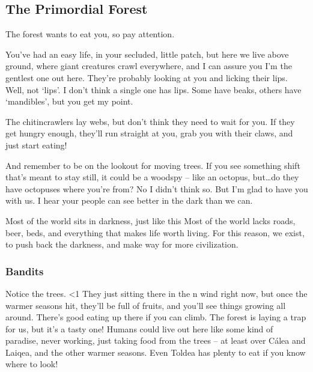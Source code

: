 \begin{multicols}{2}

\subsection*{The Primordial Forest}

\begin{exampletext}

  The forest wants to eat you, so pay attention.

  You've had an easy life, in your secluded, little patch, but here we live above ground, where giant creatures crawl everywhere, and I can assure you I'm the gentlest one out here.
  They're probably looking at you and licking their lips.
Well, not `lips'.
  I don't think a single one has lips.
  Some have beaks, others have `mandibles', but you get my point.

  The chitincrawlers lay webs, but don't think they need to wait for you.
  If they get hungry enough, they'll run straight at you, grab you with their claws, and just start eating!

  And remember to be on the lookout for moving trees.
  If you see something shift that's meant to stay still, it could be a woodspy -- like an octopus, but\ldots do they have octopuses where you're from?
  No I didn't think so.
  But I'm glad to have you with us.
  I hear your people can see better in the dark than we can.

  Most of the world sits in darkness, just like this
  Most of the world lacks roads, beer, beds, and everything that makes life worth living.
  For this reason, we exist, to push back the darkness, and make way for more civilization.

  \subsubsection*{Bandits}

  Notice the trees.
  \ifnum\value{temperature}<1
    They just sitting there in the \seasonDesc n wind right now, but once the warmer seasons hit, they'll be full of fruits, and you'll see things growing all around.
  \else
    There's good eating up there if you can climb.
    The forest is laying a trap for us, but it's a tasty one!
  \fi
  Humans could live out here like some kind of paradise, never working, just taking food from the trees -- at least over C\'alea and Laiqea, and the other warmer seasons.
  Even Toldea has plenty to eat if you know where to look!


\end{exampletext}
\end{multicols}
